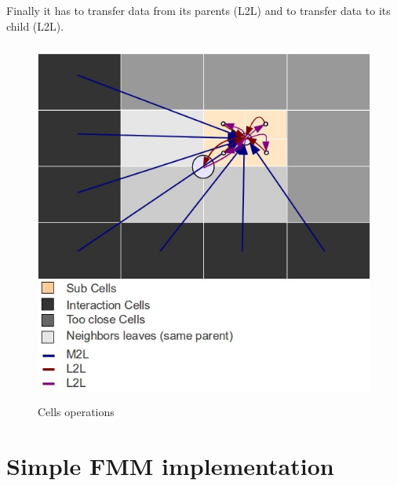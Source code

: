 \documentclass[12pt,letterpaper,titlepage]{report}
\begin{document}
Finally it has to transfer data from its parents (L2L) and to transfer data to its child (L2L).
\begin{figure}[h!]
\begin{center}
\includegraphics[width=12cm, height=12cm, keepaspectratio=true]{cells.jpg}
\caption{Cells operations}
\end{center}
\end{figure}
\chapter{Simple FMM implementation}
\end{document}
